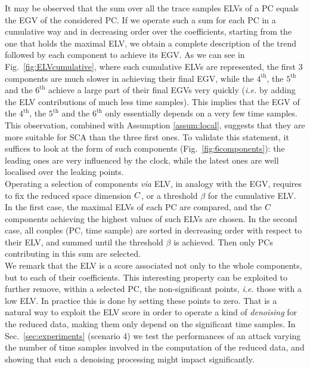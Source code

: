 It may be observed that the sum over all the trace samples ELVs of a PC equals the EGV of the considered PC. If we operate such a sum for each PC in a cumulative way and in decreasing order over the coefficients, starting from the one that holds the maximal ELV, we obtain a complete description of the trend followed by each component to achieve its EGV. As we can see in Fig.~\ref{fig:ELVcumulative}, where such cumulative ELVs are represented, the first 3 components are much slower in achieving their final EGV, while the $4^\text{th}$, the $5^\text{th}$ and the $6^\text{th}$ achieve a large part of their final EGVs very quickly ({\em i.e.} by adding the ELV contributions of much less time samples). This implies that the EGV of the $4^\text{th}$, the $5^\text{th}$ and the $6^\text{th}$ only essentially depends on a very few time samples. This observation, combined with Assumption \ref{assum:local}, suggests that they are more suitable for SCA than the three first ones. To validate this statement, it suffices to look at the form of such components (Fig.~\ref{fig:6components}): the leading ones are very influenced by the clock, while the latest ones are well localised over the leaking points.\\

Operating a selection of components {\em via} ELV, in analogy with the EGV, requires to fix the reduced space dimension $C$, or a threshold $\beta$ for the cumulative ELV. In the first case, the maximal ELVs of each PC are compared, and the $C$ components achieving the highest values of such ELVs are chosen. In the second case, all couples (PC, time sample) are sorted in decreasing order with respect to their ELV, and summed until the threshold $\beta$ is achieved. Then only PCs contributing in this sum are selected. \\

We remark that the ELV is a score associated not only to the whole components, but to each of their coefficients. This interesting property can be exploited to further remove, within a selected PC, the non-significant points, {\em i.e.} those with a low ELV. In practice this is done by setting these points to zero. That is a natural way to exploit the ELV score in order to operate a kind of {\em denoising} for the reduced data, making them only depend  on the significant time samples. In Sec.~\ref{sec:experiments} (scenario 4) we test the performances of an attack varying the number of time samples involved in the computation of the reduced data, and showing that such a denoising processing might impact significantly. 
 


